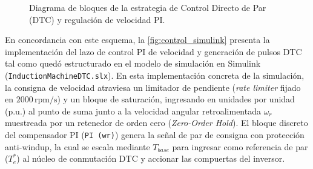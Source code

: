 \documentclass[conference]{IEEEtran}
\begin{document}
\begin{figure}[H]
\caption{Diagrama de bloques de la estrategia de Control Directo de Par (DTC) y regulaci\'on de velocidad PI.}
\label{fig:control_dtc_tikz}
\end{figure}

En concordancia con este esquema, la \autoref{fig:control_simulink} presenta la implementaci\'on del lazo de control PI de velocidad y generaci\'on de pulsos DTC tal como qued\'o estructurado en el modelo de simulaci\'on en Simulink (\texttt{InductionMachineDTC.slx}). En esta implementaci\'on concreta de la simulaci\'on, la consigna de velocidad atraviesa un limitador de pendiente (\textit{rate limiter} fijado en $2000\,\text{rpm/s}$) y un bloque de saturaci\'on, ingresando en unidades por unidad (p.u.) al punto de suma junto a la velocidad angular retroalimentada $\omega_r$ muestreada por un retenedor de orden cero (\textit{Zero-Order Hold}). El bloque discreto del compensador PI (\texttt{PI (wr)}) genera la se\~nal de par de consigna con protecci\'on anti-windup, la cual se escala mediante $T_{base}$ para ingresar como referencia de par ($T_e^*$) al n\'ucleo de conmutaci\'on DTC y accionar las compuertas del inversor.
\end{document}

